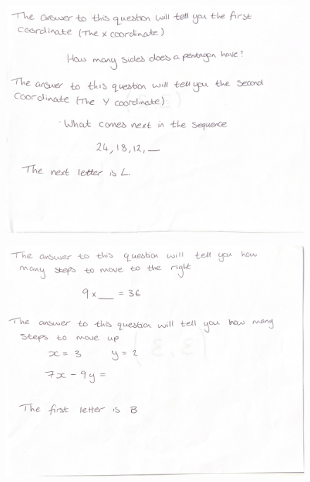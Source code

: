 \documentclass[11pt, a4paper, notitlepage]{article}
\begin{document}
\begin{figure}[h]
    \centering
    \includegraphics[width=\textwidth]{Images/CoordinateGrid_questions-pages-3.pdf}
\end{figure}
\begin{figure}[h]
    \centering
    \includegraphics[width=\textwidth]{Images/CoordinateGrid_questions-pages-4.pdf}
\end{figure}
\end{document}
